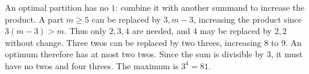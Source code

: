 An optimal partition has no $1$: combine it with another summand to increase the product. A part $m\ge5$ can be replaced by $3,m-3$, increasing the product since $3(m-3)>m$. Thus only $2,3,4$ are needed, and $4$ may be replaced by $2,2$ without change. Three twos can be replaced by two threes, increasing $8$ to $9$. An optimum therefore has at most two twos. Since the sum is divisible by $3$, it must have no twos and four threes. The maximum is $3^4=\boxed{81}$.
